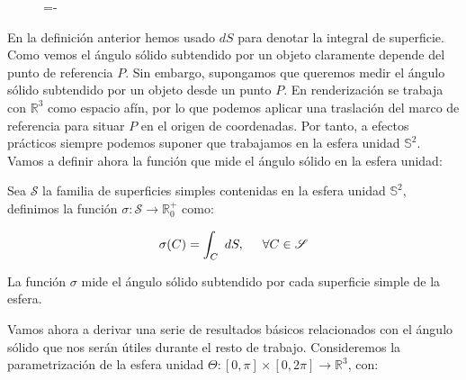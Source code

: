 \begin{figure}[h]
  \lineskip=-\fboxrule
\end{figure}

En la definición anterior hemos usado $dS$ para denotar la integral de superficie. Como vemos el ángulo sólido subtendido por un objeto claramente depende del punto de referencia $P$. Sin embargo, supongamos que queremos medir el ángulo sólido subtendido por un objeto desde un punto $P$. En renderización se trabaja con $\mathds{R}^3$ como espacio afín, por lo que podemos aplicar una traslación del marco de referencia para situar $P$ en el origen de coordenadas. Por tanto, a efectos prácticos siempre podemos suponer que trabajamos en la esfera unidad $\mathds{S}^2$. Vamos a definir ahora la función que mide el ángulo sólido en la esfera unidad:

\begin{definicion}
  Sea $\mathscr{S}$ la familia de superficies simples contenidas en la esfera unidad $\mathds {S}^2$, definimos la función $\sigma :\mathscr{S} \rightarrow \mathds{R}^+_0$ como:

  $$\sigma(C) = \int_C \text{ }dS , \hspace{0.5cm} \forall C\in \mathscr{S}$$

  La función $\sigma$ mide el ángulo sólido subtendido por cada superficie simple de la esfera.
\end{definicion}



Vamos ahora a derivar una serie de resultados básicos relacionados con el ángulo sólido que nos serán útiles durante el resto de trabajo. Consideremos la parametrización de la esfera unidad $\Theta:[0,\pi ]\times [0,2\pi ]\rightarrow \mathds{R}^3$, con:

